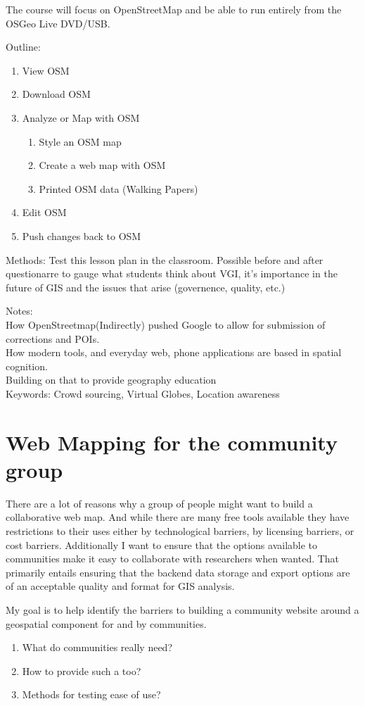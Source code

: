 \documentclass[12pt,letterpaper]{article}
\begin{document}
The course will focus on OpenStreetMap and be able to run entirely from the OSGeo Live DVD/USB.

Outline:
\begin{enumerate}
\item View OSM
\item Download OSM
\item Analyze or Map with OSM
	\begin{enumerate}
	\item Style an OSM map
	\item Create a web map with OSM
	\item Printed OSM data (Walking Papers)
	\end{enumerate}
\item Edit OSM
\item Push changes back to OSM
\end{enumerate}
Methods: Test this lesson plan in the classroom. Possible before and after questionarre to gauge what students think about VGI, it's importance in the future of GIS and the issues that arise (governence, quality, etc.)

Notes:
\\ How OpenStreetmap(Indirectly) pushed Google to allow for submission of corrections and POIs.
\\ How modern tools, and everyday web, phone applications are based in spatial cognition.
\\ Building on that to provide geography education
\\ Keywords: Crowd sourcing, Virtual Globes, Location awareness

\section{Web Mapping for the community group}
	There are a lot of reasons why a group of people might want to build a collaborative web map. And while there are many free tools available they have restrictions to their uses either by technological barriers, by licensing barriers, or cost barriers. Additionally I want to ensure that the options available to communities make it easy to collaborate with researchers when wanted. That primarily entails ensuring that the backend data storage and export options are of an acceptable quality and format for GIS analysis.
	
My goal is to help identify the barriers to building a community website around a geospatial component for and by communities. 
\begin{enumerate}
\item What do communities really need?
\item How to provide such a too?
\item Methods for testing ease of use?
\end{enumerate}
\end{document}
